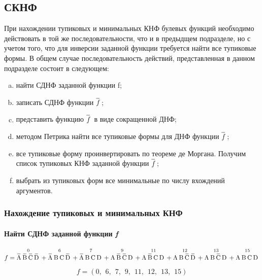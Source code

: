 \documentclass[a4paper, 14pt]{extarticle}
\begin{document}
\newpage

\subsection{СКНФ}

При нахождении тупиковых и минимальных КНФ булевых функций необходимо действовать в той 
же последовательности, что и в предыдщем подразделе, но с учетом того, что для инверсии 
заданной функции требуется найти все тупиковые формы. В общем случае последовательность
действий, представленная в данном подразделе состоит в следующем:

\begin{enumerate}[a)]
  \item найти СДНФ заданной функции f;
  \item записать СДНФ функции $\OV{\itshape f}$;
  \item представить функцию $\OV{\itshape f}$ в виде сокращенной ДНФ;
  \item методом Петрика найти все тупиковые формы для ДНФ функции $\OV{\itshape f}$;
  \item все тупиковые форму проинвертировать по теореме де Моргана. Получим
  список тупиковых КНФ заданной функции $\OV{\itshape f}$;
  \item выбрать из тупиковых форм все минимальные по числу вхождений аргументов.
\end{enumerate}

\subsubsection{Нахождение тупиковых и минимальных КНФ}

\paragraph{Найти СДНФ заданной функции \textit{f}}

\begin{equation*}
  f = \overset{0}{\OV{A}\OV{B}\OV{C}\OV{D}} + \overset{6}{\OV{A}\NOV{B}\NOV{C}\OV{D}} + 
  \overset{7}{\OV{A}\NOV{B}\NOV{C}\NOV{D}} + \overset{9}{\NOV{A}\OV{B}\OV{C}\NOV{D}} + 
  \overset{11}{\NOV{A}\OV{B}\NOV{C}\NOV{D}} + \overset{12}{\NOV{A}\NOV{B}\OV{C}\OV{D}} + 
  \overset{13}{\NOV{A}\NOV{B}\OV{C}\NOV{D}} + \overset{15}{\vphantom{\OV{A}}\NOV{A}\NOV{B}\NOV{C}\NOV{D}}
\end{equation*}

\begin{equation*}
  f = \left(0,\hspace{5pt} 6,\hspace{5pt} 7,\hspace{5pt} 9,\hspace{5pt} 11,
  \hspace{5pt} 12,\hspace{5pt} 13,\hspace{5pt} 15\right)
\end{equation*}
\end{document}
